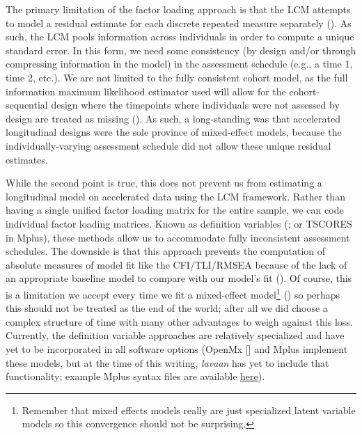 \documentclass[11pt]{article}
\begin{document}
The primary limitation of the factor loading approach is that the LCM attempts to model a residual estimate for each discrete repeated measure separately (\cite{bollen_latent_2006,curran_twelve_2010}). As such, the LCM pools information across individuals in order to compute a unique standard error. In this form, we need some consistency (by design and/or through compressing information in the model) in the assessment schedule (e.g., a time 1, time 2, etc.). We are not limited to the fully consistent cohort model, as the full information maximum likelihood estimator used will allow for the cohort-sequential design where the timepoints where individuals were not assessed by design are treated as missing (\cite{little_planned_2013}). As such, a long-standing  was that accelerated longitudinal designs were the sole province of mixed-effect models, because the individually-varying assessment schedule did not allow these unique residual estimates.

While the second point is true, this does not prevent us from estimating a longitudinal model on accelerated data using the LCM framework. Rather than having a single unified factor loading matrix for the entire sample, we can code individual factor loading matrices. Known as definition variables (\cite{mehta_people_2005,mehta_putting_2000}; or TSCORES in Mplus), these methods allow us to accommodate fully inconsistent assessment schedules. The downside is that this approach prevents the computation of absolute measures of model fit like the CFI/TLI/RMSEA because of the lack of an appropriate baseline model to compare with our model’s fit (\cite{mehta_putting_2000}). Of course, this is a limitation we accept every time we fit a mixed-effect model\footnote{Remember that mixed effects models really are just specialized latent variable models so this convergence should not be surprising.} (\cite{curran_have_2003}) so perhaps this should not be treated as the end of the world; after all we did choose a complex structure of time with many other advantages to weigh against this loss. Currently, the definition variable approaches are relatively specialized and have yet to be incorporated in all software options (OpenMx [\cite{von_oertzen_structural_2015}] and Mplus implement these models, but at the time of this writing, \textit{lavaan} has yet to include that functionality; example Mplus syntax files are available \href{https://e-m-mccormick.github.io/static/longitudinal-primer/03-time.html#time-coding}{here}).
\end{document}
